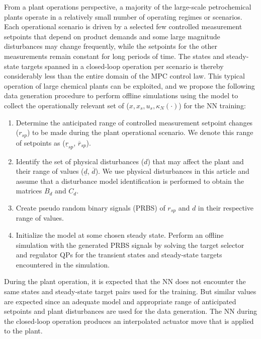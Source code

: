\documentclass[preprint,5p, twocolumn, authoryear]{elsarticle}
\begin{document}
From a plant operations perspective,
a majority of the large-scale petrochemical plants
operate in a relatively small number of operating regimes
or scenarios. Each operational scenario is driven 
by a selected few controlled measurement 
setpoints that depend on product demands
and some large magnitude disturbances
may change frequently, 
while the setpoints for 
the other measurements remain constant for long periods 
of time. The states and steady-state targets 
spanned in a closed-loop 
operation per scenario is thereby considerably less 
than the entire domain of the MPC control law.
This typical operation of large chemical plants
can be exploited, and we propose the 
following data generation procedure 
to perform offline simulations using the model to 
collect the operationally 
relevant set of ($x, x_s, u_s, \kappa_N(\cdot)$) 
for the NN training:

\begin{enumerate}
    \item Determine the anticipated range of 
    controlled measurement setpoint changes ($r_{sp}$)
    to be made during the plant operational 
    scenario. We denote 
    this range of setpoints as ($\underline{r}_{sp}$, $\overline{r}_{sp}$).
    \item Identify the set of physical disturbances ($d$) 
    that may affect the plant and their range of values 
    ($\underline{d}$, $\overline{d}$). We use 
    physical disturbances in this article and assume that 
    a disturbance model identification is performed 
    to obtain the matrices $B_d$ and $C_d$.
    \item Create pseudo random binary signals (PRBS)
    of $r_{sp}$ and $d$ in their respective range of values.
    \item Initialize the model at some chosen steady state.
    Perform an offline simulation with the 
    generated PRBS signals by solving the target
    selector and regulator QPs for the transient states
    and steady-state targets encountered in the simulation. 
\end{enumerate}

During the plant operation, it is expected 
that the NN does not encounter 
the same states and steady-state 
target pairs used for the training. But similar
values are expected since an 
adequate model and appropriate 
range of anticipated 
setpoints and plant disturbances are 
used for the data generation. 
The NN during the closed-loop operation
produces an interpolated actuator
move that is applied to the plant. 
\end{document}
